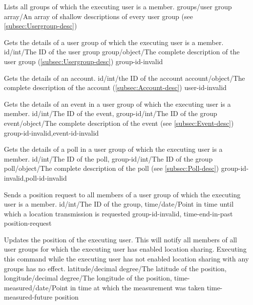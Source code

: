 \documentclass[parskip=full,11pt]{scrartcl}
\begin{document}
{Lists all groups of which the executing user is a member.}
{}
{groups/user group array/An array of shallow descriptions of every user group
(see \ref{subsec:Usergroup-desc})}
{}
{}

{Gets the details of a user group of which the executing user is a member.}
{id/int/The ID of the user group}
{group/object/The complete description of the user group
(\ref{subsec:Usergroup-desc})}
{group-id-invalid}
{}

{Gets the details of an account.}
{id/int/the ID of the account}
{account/object/The complete description of the account
(\ref{subsec:Account-desc})}
{user-id-invalid}
{}

{Gets the details of an event in a user group of which the executing user is
a member.}
{id/int/The ID of the event,
group-id/int/The ID of the group}
{event/object/The complete description of the event (see \ref{subsec:Event-desc})}
{group-id-invalid,event-id-invalid}
{}

{Gets the details of a poll in a user group of which the executing user is
a member.}
{id/int/The ID of the poll,
group-id/int/The ID of the group}
{poll/object/The complete description of the poll (see \ref{subsec:Poll-desc})}
{group-id-invalid,poll-id-invalid}
{}

{Sends a position request to all members of a user group of which the executing
user is a member.}
{id/int/The ID of the group,
time/date/Point in time until which a location transmission is requested}
{}
{group-id-invalid, time-end-in-past}
{position-request}

{Updates the position of the executing user.
This will notify all members of all user groups for which the executing user
has enabled location sharing.
Executing this command while the executing user has not enabled location
sharing with any groups has no effect.}
{latitude/decimal degree/The latitude of the position,
longitude/decimal degree/The longitude of the position,
time-measured/date/Point in time at which the measurement was taken}
{}
{time-measured-future}
{position}
\end{document}
